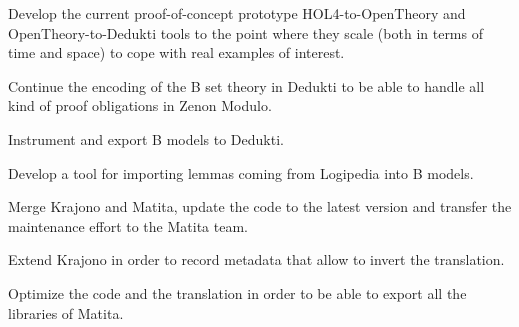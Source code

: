 \begin{workpackage}
\begin{tasklist}
\begin{task}[id=HOL4,
  title=Instrument HOL4,
  lead=Cha,
  ChaRM=16.5,
  wphases=1-14]
%
\begin{compactitem}
\item Develop the current proof-of-concept prototype
    HOL4-to-OpenTheory and OpenTheory-to-Dedukti tools to the point
    where they scale (both in terms of time and space) to cope with
    real examples of interest.
\end{compactitem}
\end{task}

\begin{task}[id=atelier-b,
  title=Instrument Atelier-B/Rodin,
  lead=Imt,
  CleRM=0, %
  ImtRM=0, %
  TouRM=0] %
%
\begin{compactitem}
\item Continue the encoding of the B set theory in Dedukti to be
  able to handle all kind of proof obligations in Zenon Modulo.
\item Instrument and export B models to Dedukti.
\item Develop a tool for importing lemmas coming from Logipedia
into B models.
\end{compactitem}
\end{task}

\begin{task}[id=matita,
  title=Integrate the Matita translator in Matita itself,
  lead=Bol,
  BolRM=4,
  wphases=0-12]
\begin{compactitem}
\item Merge Krajono and Matita, update the code to the latest
  version and transfer the maintenance effort to the Matita team.
\item Extend Krajono in order to record metadata that allow to
  invert the translation.
\item Optimize the code and the translation in order to be able to
  export all the libraries of Matita.
\end{compactitem}
\end{task}


\end{tasklist}
\end{workpackage}
